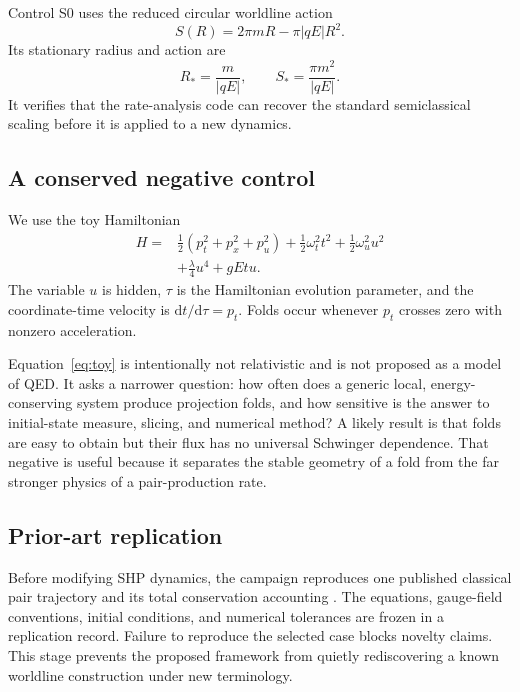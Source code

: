 \documentclass[aps,prd,reprint,nofootinbib,longbibliography]{revtex4-2}
\newcommand{\dd}{\mathrm{d}}
\begin{document}
Control S0 uses the reduced circular worldline action
\begin{equation}
  S(R)=2\pi mR-\pi|qE|R^2.
\end{equation}
Its stationary radius and action are
\begin{equation}
  R_*=\frac{m}{|qE|},
  \qquad
  S_*=\frac{\pi m^2}{|qE|}.
\end{equation}
It verifies that the rate-analysis code can recover the standard semiclassical
scaling before it is applied to a new dynamics.

\subsection{A conserved negative control}

We use the toy Hamiltonian
\begin{equation}
\begin{split}
H={}&\frac{1}{2}(p_t^2+p_x^2+p_u^2)
+\frac{1}{2}\omega_t^2t^2
+\frac{1}{2}\omega_u^2u^2\\
&+\frac{\lambda}{4}u^4+gEtu.
\end{split}
\label{eq:toy}
\end{equation}
The variable $u$ is hidden, $\tau$ is the Hamiltonian evolution parameter, and the
coordinate-time velocity is $\dd t/\dd\tau=p_t$.  Folds occur whenever $p_t$
crosses zero with nonzero acceleration.

Equation~\eqref{eq:toy} is intentionally not relativistic and is not proposed as a
model of QED.  It asks a narrower question: how often does a generic local,
energy-conserving system produce projection folds, and how sensitive is the answer
to initial-state measure, slicing, and numerical method?  A likely result is that
folds are easy to obtain but their flux has no universal Schwinger dependence.
That negative is useful because it separates the stable geometry of a fold from the
far stronger physics of a pair-production rate.

\subsection{Prior-art replication}

Before modifying SHP dynamics, the campaign reproduces one published classical pair
trajectory and its total conservation accounting \cite{Land2017}.  The equations,
gauge-field conventions, initial conditions, and numerical tolerances are frozen in
a replication record.  Failure to reproduce the selected case blocks novelty
claims.  This stage prevents the proposed framework from quietly rediscovering a
known worldline construction under new terminology.
\end{document}
